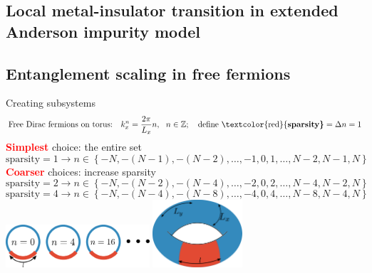 \documentclass[10pt,aspectratio=169]{beamer}
\newcommand{\focus}[1]{\textcolor{red}{\bf{#1}}}
\begin{document}
\begin{frame}{}
\section{Local metal-insulator transition in extended Anderson impurity model}
\end{frame}



\begin{frame}{}
\section{Entanglement scaling in free fermions}
\end{frame}

\begin{frame}{Creating subsystems}
	\[\text{Free Dirac fermions on torus:}~ ~ ~ k_x^n = \frac{2\pi }{L_x} n,~ ~ n \in \mathbb{Z};~~~ \text{define \focus{sparsity}} = \Delta n = 1\]
	\focus{Simplest} choice: the entire set
	\[\text{sparsity} = 1 \longrightarrow n \in \left\{-N,-(N-1),-(N-2),\ldots,-1,0,1,\ldots,N-2,N-1,N\right\} \]
	\focus{Coarser} choices: increase sparsity
	\[\text{sparsity} = 2 \longrightarrow n \in \left\{-N,-(N-2),-(N-4),\ldots,-2,0,2,\ldots,N-4,N-2,N\right\} \]
	\[\text{sparsity} = 4 \longrightarrow n \in \left\{-N,-(N-4),-(N-8),\ldots,-4,0,4,\ldots,N-8,N-4,N\right\} \]
	\centering
	\vspace*{\fill}
	\includegraphics[width=0.4\textwidth]{figures/A_mi.pdf}
	\hspace*{\fill}
	\includegraphics[width=0.25\textwidth]{figures/subsystem-torus.pdf}
\end{frame}
\end{document}
